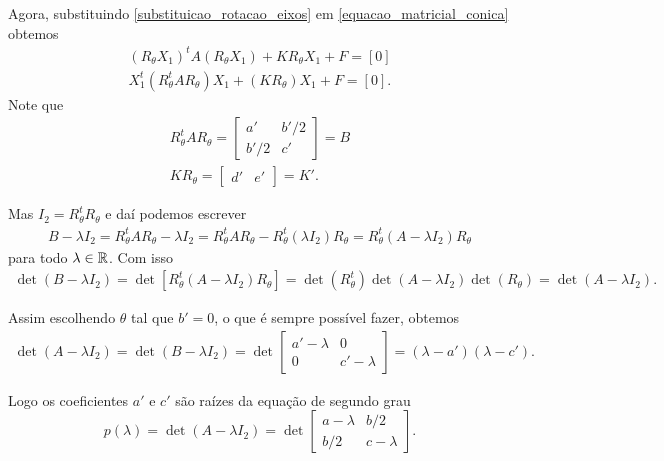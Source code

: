 Agora, substituindo \eqref{substituicao_rotacao_eixos} em \eqref{equacao_matricial_conica} obtemos
\begin{align*}
    (R_\theta X_1)^t A (R_\theta X_1) + KR_\theta X_1 + F = [0] \\
    X_1^t(R_\theta^t A R_\theta)X_1 + (KR_\theta)X_1 + F = [0].
\end{align*}
Note que
\begin{align*}
    R_\theta^t A R_\theta = \begin{bmatrix}
                                a'   & b'/2 \\
                                b'/2 & c'
                            \end{bmatrix} = B \\
    KR_\theta = \begin{bmatrix}
                    d' & e'
                \end{bmatrix} = K'.
\end{align*}

Mas $I_2 = R_\theta^t R_\theta$ e daí podemos escrever
\begin{align*}
    B - \lambda I_2 = R_\theta^t A R_\theta - \lambda I_2 = R_\theta^t A R_\theta - R_\theta^t (\lambda I_2) R_\theta = R_\theta^t (A - \lambda I_2)R_\theta
\end{align*}
para todo $\lambda \in \mathbb{R}$. Com isso
\begin{align*}
    \det(B - \lambda I_2) = \det[R_\theta^t(A - \lambda I_2)R_\theta] = \det(R_\theta^t)\det(A - \lambda I_2)\det(R_\theta) = \det(A - \lambda I_2).
\end{align*}

Assim escolhendo $\theta$ tal que $b' = 0$, o que é sempre possível fazer, obtemos
\begin{align*}
    \det(A - \lambda I_2) = \det(B - \lambda I_2) = \det \begin{bmatrix}
                                                             a' - \lambda & 0            \\
                                                             0            & c' - \lambda
                                                         \end{bmatrix} = (\lambda - a')(\lambda - c').
\end{align*}

Logo os coeficientes $a'$ e $c'$ são raízes da equação de segundo grau
\begin{equation}
    p(\lambda) = \det(A - \lambda I_2) = \det \begin{bmatrix}
        a - \lambda & b/2         \\
        b/2         & c - \lambda
    \end{bmatrix}.
\end{equation}

